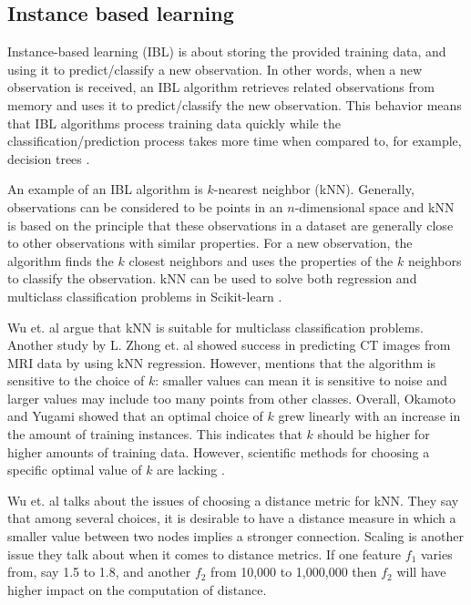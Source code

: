 	\subsection{Instance based learning} \label{sec:knn}
	Instance-based learning (IBL) is about storing the provided training data, and using it to predict/classify a new observation. In other words, when a new observation is received, an IBL algorithm retrieves related observations from memory and uses it to predict/classify the new observation. This behavior means that IBL algorithms process training data quickly while the classification/prediction process takes more time when compared to, for example, decision trees \cite{ARTICLE:8}. 

	An example of an IBL algorithm is $k$-nearest neighbor (kNN). Generally, observations can be considered to be points in an $n$-dimensional space and kNN is based on the principle that these observations in a dataset are generally close to other observations with similar properties.  For a new observation, the algorithm finds the $k$ closest neighbors and uses the properties of the $k$ neighbors to classify the observation. kNN can be used to solve both regression and multiclass classification problems in Scikit-learn \cite{WEBSITE:17, WEBSITE:18}.

	Wu et. al \cite{ARTICLE:9} argue that kNN is suitable for multiclass classification problems. Another study by L. Zhong et. al \cite{IP:3} showed success in predicting CT images from MRI data by using kNN regression. However, \cite{ARTICLE:9} mentions that the algorithm is sensitive to the choice of $k$: smaller values can mean it is sensitive to noise and larger values may include too many points from other classes. Overall, Okamoto and Yugami \cite{ARTICLE:12} showed that an optimal choice of $k$ grew linearly with an increase in the amount of training instances. This indicates that $k$ should be higher for higher amounts of training data. However, scientific methods for choosing a specific optimal value of $k$  are lacking \cite{ARTICLE:7}.

	Wu et. al \cite{ARTICLE:9} talks about the issues of choosing a distance metric for kNN. They say that among several choices, it is desirable to have a distance measure in which a smaller value between two nodes implies a stronger connection. Scaling is another issue they talk about when it comes to distance metrics. If one feature $f_1$ varies from, say 1.5 to 1.8, and another $f_2$ from 10,000 to 1,000,000 then $f_2$ will have higher impact on the computation of distance. 
	
